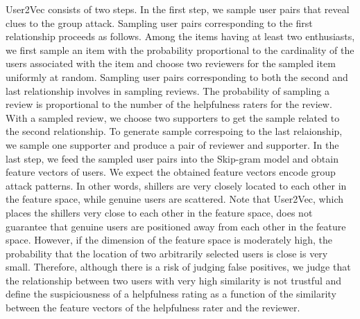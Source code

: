 \documentclass[master,english,final]{kaist-ucs}
\begin{document}
User2Vec consists of two steps.
In the first step, we sample user pairs that reveal clues to the group attack.
Sampling user pairs corresponding to the first relationship proceeds as follows.
Among the items having at least two enthusiasts, we first sample an item with the probability proportional to the cardinality of the users associated with the item and choose two reviewers for the sampled item uniformly at random.
Sampling user pairs corresponding to both the second and last relationship involves in sampling reviews.
The probability of sampling a review is proportional to the number of the helpfulness raters for the review.
With a sampled review, we choose two supporters to get the sample related to the second relationship.
To generate sample correspoing to the last relaionship, we sample one supporter and produce a pair of reviewer and supporter.
In the last step, we feed the sampled user pairs into the Skip-gram model and obtain feature vectors of users.
We expect the obtained feature vectors encode group attack patterns.
In other words, shillers are very closely located to each other in the feature space, while genuine users are scattered.
Note that User2Vec, which places the shillers very close to each other in the feature space, does not guarantee that genuine users are positioned away from each other in the feature space.
However, if the dimension of the feature space is moderately high, the probability that the location of two arbitrarily selected users is close is very small.
Therefore, although there is a risk of judging false positives, we judge that the relationship between two users with very high similarity is not trustful and define the suspiciousness of a helpfulness rating as a function of the similarity between the feature vectors of the helpfulness rater and the reviewer.
\end{document}
